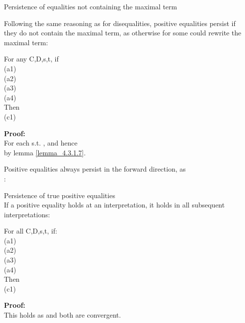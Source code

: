 \begin{lemma}{Persistence of equalities not containing the maximal term}
\label{lemma_4.3.1.9}

\noindent
Following the same reasoning as for disequalities, positive equalities persist if they do not contain the maximal term,
as otherwise  for some  could rewrite the maximal term:

\bigskip

\noindent
For any C,D,s,t, if\\
(a1) \\
(a2) \\
(a3) \\
(a4) \\
Then\\
(c1) 

\noindent
\textbf{Proof:}\\
For each  s.t. ,  and hence \\
 by lemma \ref{lemma_4.3.1.7}.
\end{lemma}

\noindent
Positive equalities always persist in the forward direction, as \\
:
\begin{lemma}
\label{lemma_4.3.1.10}
Persistence of true positive equalities\\
If a positive equality holds at an interpretation, it holds in all subsequent interpretations:

\noindent
For all C,D,s,t, if:\\
(a1) \\
(a2) \\
(a3) \\
(a4) \\
Then\\
(c1) 

\noindent
\textbf{Proof:}\\
This holds as  and both are convergent.
\end{lemma}

